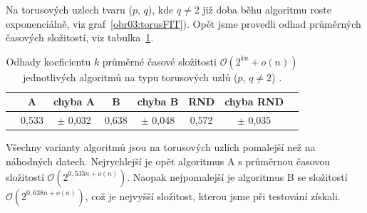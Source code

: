Na torusových uzlech tvaru ($p$, $q$), kde $q\neq 2$ již doba běhu algoritmu roste exponenciálně, viz graf~\ref{obr03:torusFIT}). Opět jsme provedli odhad průměrných časových složitostí, viz tabulka~\ref{torustab}.

\begin{table}[b]
\centering
  \begin{tabular}{*{8}{c}}
    \toprule
       & A & chyba A & B & chyba B &  RND & chyba RND \\ 
    \midrule
      & 0,533 & $\pm$ 0,032  &   0,638 & $\pm$ 0,048   &  0,572 & $\pm$ 0,035\\
    \bottomrule
  \end{tabular}
    \caption{Odhady koeficientu $k$ průměrné časové složitosti $\mathcal{O}\left(2^{kn} + o(n)\right)$ jednotlivých algoritmů na typu torusových uzlů ($p$, $q\neq 2$) .} \label{torustab}
    
\end{table}

Všechny varianty algoritmů jsou na torusových uzlích pomalejší než na náhodných datech. Nejrychlejší je opět algoritmus A s průměrnou časovou složitostí $\mathcal{O}\left(2^{0,533 n + o(n)}\right)$. Naopak nejpomalejší je algoritmus B se složitostí $\mathcal{O}\left(2^{0,638 n + o(n)}\right)$, což je nejvyšší složitost, kterou jsme při testování získali.

